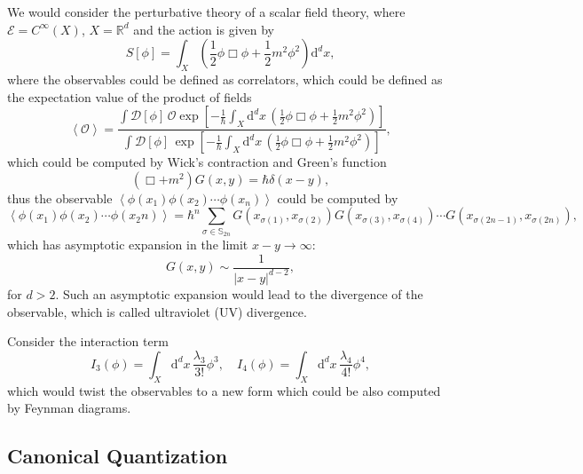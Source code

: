 \documentclass[10pt]{article}
\begin{document}
We would consider the perturbative theory of a scalar field theory, where $ \mathcal{E} = C^{\infty }(X)$, $ X = \mathbb{R}^{d}$ and the action is given by
\begin{equation*}
  S[\phi] = \int _{X} \left( \frac{1}{2} \phi \Box \phi + \frac{1}{2} m^{2} \phi^{2} \right) \mathrm{d}^{d} x,
\end{equation*}
where the observables could be defined as correlators, which could be defined as the expectation value of the product of fields
\begin{equation*}
  \left< \mathcal{O} \right> = \frac{\int \mathcal{D}[\phi] \, \mathcal{O} \exp \left[ - \frac{1}{\hbar}\int_{X} \mathrm{d}^{d} x \, \left( \frac{1}{2} \phi \Box \phi + \frac{1}{2} m^{2} \phi^{2} \right) \right] }{\int \mathcal{D}[\phi] \, \exp \left[ - \frac{1}{\hbar} \int_{X} \mathrm{d}^{d} x \, \left( \frac{1}{2} \phi \Box \phi + \frac{1}{2} m^{2} \phi^{2}  \right)\right] },
\end{equation*}
which could be computed by Wick's contraction and Green's function
\begin{equation*}
  \left( \Box + m^{2} \right) G(x,y) = \hbar \delta(x-y),
\end{equation*}
thus the observable $\left< \phi(x_1) \phi(x_2) \cdots \phi(x_n) \right>$ could be computed by
\begin{equation*}
  \left< \phi(x_1) \phi(x_2) \cdots \phi(x_2n) \right> = \hbar^{n} \sum_{\sigma \in \mathbb{S}_{2n}} G(x_{\sigma(1)}, x_{\sigma(2)}) G(x_{\sigma(3)}, x_{\sigma(4)}) \cdots G(x_{\sigma(2n-1)}, x_{\sigma(2n)}),
\end{equation*}
which has asymptotic expansion in the limit $ x-y \rightarrow \infty $:
\begin{equation*}
  G(x,y) \sim \frac{1}{\left| x - y \right|^{d-2}},
\end{equation*}
for $ d>2$. Such an asymptotic expansion would lead to the divergence of the observable, which is called ultraviolet (UV) divergence.

Consider the interaction term
\begin{equation*}
  I_3(\phi) = \int_{X} \mathrm{d}^{d} x \, \frac{\lambda_3}{3!} \phi^{3}, \quad
  I_4(\phi) = \int_{X} \mathrm{d}^{d} x \, \frac{\lambda_4}{4!} \phi^{4},
\end{equation*}
which would twist the observables to a new form which could be also computed by Feynman diagrams.

\subsection{Canonical Quantization}
\end{document}
